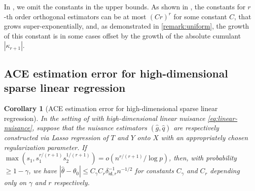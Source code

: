\documentclass{article}
\newtheorem{corollary}{Corollary}[section]
\begin{document}
In , we omit the constants in the upper bounds. As shown in , the constants for $r$-th order orthogonal estimators can be at most $(Cr)^r$ for some constant $C$, that grows super-exponentially, and, as demonstrated in \cref{remark:uniform}, the growth of this constant is in some cases offset by the growth of the absolute cumulant $|\kappa_{r+1}|$.
%

%

%

%
%
%
%
%
%
%
%



\subsection{ACE estimation error for high-dimensional sparse linear regression}
\label{subsec:proof-high-dim-linear-regression}

\begin{corollary}[ACE estimation error for high-dimensional sparse linear regression]
\label{cor:high-dim-linear-regression}
    In the setting of  with high-dimensional linear nuisance \cref{eq:linear-nuisance}, suppose that the nuisance estimators $(\hat{g},\hat{q})$ are respectively constructed via Lasso regression of $T$ and $Y$ onto $X$ with an appropriately chosen regularization parameter. 
    If $\max(s_1, s_1^{r/(r+1)} s_2^{1/(r+1)}) = o(n^{r/(r+1)}/\log p)$, then,  
    with probability $\geq 1-\gamma$, we have $|\hat{\theta}-\theta_0|\leq C_{\gamma} C_{r} \delta_{\mathsf{id},r}^{-1} n^{-1/2}$
    for constants $C_\gamma$ and $C_r$ depending only on $\gamma$ and $r$ respectively.
\end{corollary}
\end{document}
